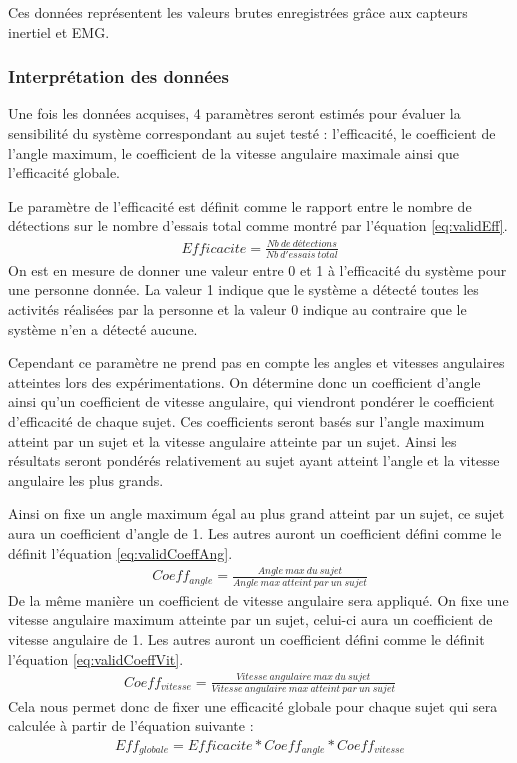 \documentclass[letterpaper, twoside, 12pt, memoire, creativecommons, hyperref]{thETS}
\begin{document}
Ces données représentent les valeurs brutes enregistrées grâce aux capteurs inertiel et EMG. 

\subsubsection{Interprétation des données}

Une fois les données acquises, 4 paramètres seront estimés pour évaluer la sensibilité du système correspondant au sujet testé : l’efficacité, le coefficient de l’angle maximum, le coefficient de la vitesse angulaire maximale ainsi que l’efficacité globale.

Le paramètre de l’efficacité est définit comme le rapport entre le nombre de détections sur le nombre d’essais total comme montré par l'équation \ref{eq:validEff}.
\begin{align}\label{eq:validEff}
   Efficacite = \frac{Nb\ de\ détections}{Nb\ d'essais\ total} 
\end{align}
On est en mesure de donner une valeur entre 0 et 1 à l’efficacité du système pour une personne donnée. La valeur 1 indique que le système a détecté toutes les activités réalisées par la personne et la valeur 0 indique au contraire que le système n’en a détecté aucune. 

Cependant ce paramètre ne prend pas en compte les angles et vitesses angulaires atteintes lors des expérimentations. On détermine donc un coefficient d’angle ainsi qu’un coefficient de vitesse angulaire, qui viendront pondérer le coefficient d’efficacité de chaque sujet. Ces coefficients seront basés sur l’angle maximum atteint par un sujet et la vitesse angulaire atteinte par un sujet. Ainsi les résultats seront pondérés relativement au sujet ayant atteint l’angle et la vitesse angulaire les plus grands. 

Ainsi on fixe un angle maximum égal au plus grand atteint par un sujet, ce sujet aura un coefficient d’angle de 1. Les autres auront un coefficient défini comme le définit l'équation \ref{eq:validCoeffAng}. 
\begin{align}\label{eq:validCoeffAng}
   Coeff_{angle} = \frac{Angle\ max\ du\ sujet}{Angle\ max\ atteint\ par\ un\ sujet} 
\end{align}
De la même manière un coefficient de vitesse angulaire sera appliqué. On fixe une vitesse angulaire maximum atteinte par un sujet, celui-ci aura un coefficient de vitesse angulaire de 1. Les autres auront un coefficient défini comme le définit l'équation \ref{eq:validCoeffVit}.
\begin{align}\label{eq:validCoeffVit}
   Coeff_{vitesse} = \frac{Vitesse\ angulaire\ max\ du\ sujet}{Vitesse\ angulaire\ max\ atteint\ par\ un\ sujet} 
\end{align}
Cela nous permet donc de fixer une efficacité globale pour chaque sujet qui sera calculée à partir de l’équation suivante : 
\begin{align}\label{eq:validCoeffGlobal}
   Eff_{globale} = Efficacite * Coeff_{angle} * Coeff_{vitesse} 
\end{align}
\end{document}
